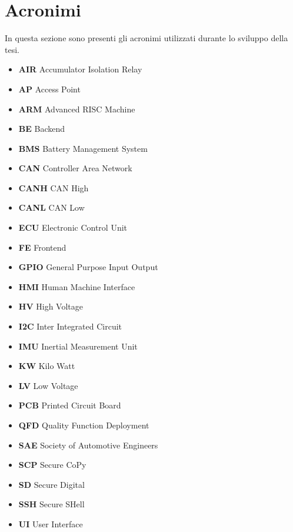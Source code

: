 \chapter*{Acronimi} %
\label{acronimi}


In questa sezione sono presenti gli acronimi utilizzati durante lo 
sviluppo della tesi.

\begin{itemize}
    \item \textbf{AIR} Accumulator Isolation Relay
    \item \textbf{AP} Access Point
    \item \textbf{ARM} Advanced RISC Machine
    \item \textbf{BE} Backend
    \item \textbf{BMS} Battery Management System
    \item \textbf{CAN} Controller Area Network
    \item \textbf{CANH} CAN High
    \item \textbf{CANL} CAN Low
    \item \textbf{ECU} Electronic Control Unit
    \item \textbf{FE} Frontend
    \item \textbf{GPIO} General Purpose Input Output
    \item \textbf{HMI} Human Machine Interface
    \item \textbf{HV} High Voltage
    \item \textbf{I2C} Inter Integrated Circuit
    \item \textbf{IMU} Inertial Measurement Unit
    \item \textbf{KW} Kilo Watt
    \item \textbf{LV} Low Voltage
    \item \textbf{PCB} Printed Circuit Board
    \item \textbf{QFD} Quality Function Deployment
    \item \textbf{SAE} Society of Automotive Engineers
    \item \textbf{SCP} Secure CoPy
    \item \textbf{SD} Secure Digital
    \item \textbf{SSH} Secure SHell
    \item \textbf{UI} User Interface
\end{itemize}

\newpage